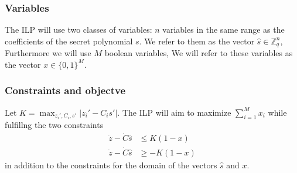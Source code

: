 
\subsubsection{Variables}
\label{sec:ilpvars}
The ILP will use two classes of variables: $n$ variables in the same range as the coefficients of the secret polynomial $s$. We refer to them as the vector $\hat{s} \in \mathds{Z}_q^n$, Furthermore we will use $M$ boolean variables, We will refer to these variables as the vector $x \in \{0, 1\}^M$. 


\subsubsection{Constraints and objectve}
Let  $K = \max_{z_{i}',C_{i}, s'}{\lvert z_{i}' - C_{i}s' \rvert}$. The ILP will aim to maximize $\sum_{i = 1}^M x_{i}$ while fulfillng the two constraints
\begin{align}
	\label{constraint_leq}
	\dot{z} - \dot{C}\hat{s} & \leq K (1 - x) \\
	\label{constraint_geq}
	\dot{z} - \dot{C}\hat{s}  & \geq - K (1 - x)
\end{align}
in addition to  the constraints for the domain of the vectors $\hat{s}$ and $x$.

